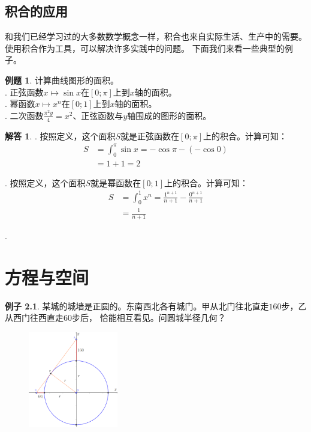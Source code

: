 \documentclass[12pt,UTF8]{ctexbook}
\theoremstyle{definition}
\newtheorem{ex}{例子}[section]
\newtheorem{et}{例题}[section]
\newtheorem*{so}{解答}
\theoremstyle{plain}
\begin{document}
\section{积合的应用}

和我们已经学习过的大多数数学概念一样，积合也来自实际生活、生产中的需要。使用积合作为工具，可以解决许多实践中的问题。
下面我们来看一些典型的例子。

\begin{et}
    计算曲线图形的面积。\\
    . 正弦函数$x\mapsto \sin{x}$在$[0;\pi]$上到$x$轴的面积。 \\
    . 幂函数$x\mapsto x^n$在$[0;1]$上到$x$轴的面积。\\
    . 二次函数$\frac{\pi^2y}{4} = x^2$、正弦函数与$y$轴围成的图形的面积。
\end{et}

\begin{so}
    . 按照定义，这个面积$S$就是正弦函数在$[0;\pi]$上的积合。计算可知：
    \begin{align*}
        S &= \int_{0}^{\pi} \sin{x} = -\cos{\pi} - (-\cos{0}) \\
        &= 1 + 1 = 2
    \end{align*}

    . 按照定义，这个面积$S$就是幂函数在$[0;1]$上的积合。计算可知：
    \begin{align*}
        S &= \int_{0}^{1} x^n = \frac{1^{n+1}}{n+1}- \frac{0^{n+1}}{n+1} \\
        &= \frac{1}{n+1}
    \end{align*}

    . 
\end{so}


\chapter{方程与空间}

\begin{ex}
    某城的城墙是正圆的。东南西北各有城门。甲从北门往北直走$160$步，乙从西门往西直走$60$步后，
    恰能相互看见。问圆城半径几何？ %
\end{ex}

\begin{figure} %
    \vspace{-30pt}
    \flushright
    \includegraphics[width=0.35\textwidth]{tu/整式方程1.png}
\end{figure}
\end{document}
